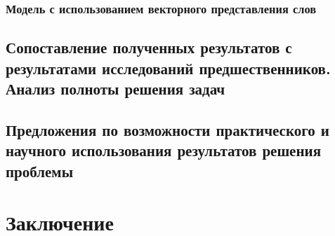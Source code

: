\documentclass[a4paper,14pt,oneside,openany]{memoir}
\begin{document}
\subsection{Модель с использованием векторного представления слов}

\section{Сопоставление полученных результатов с результатами исследований предшественников.
Анализ полноты решения задач}

\section{Предложения по возможности практического и научного использования результатов решения проблемы}

\chapter*{Заключение}

\printbibliography[title={Список использованных источников},category=cited]
\printbibliography[title={Непроцитированные источники (должно быть пусто)},notcategory=cited]
\end{document}
